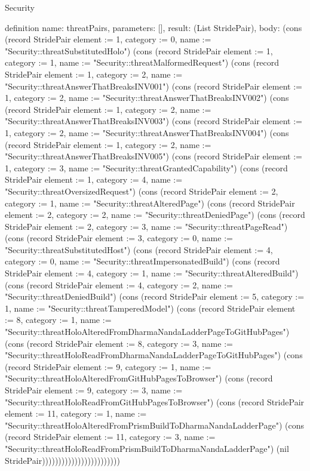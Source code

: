 \begin{lexlean}{Security}
\begin{semanticmodule}
definition{
  name: threatPairs,
  parameters: [],
  result: (List StridePair),
  body: (cons (record StridePair {element := 1, category := 0, name := "Security::threatSubstitutedHolo"}) (cons (record StridePair {element := 1, category := 1, name := "Security::threatMalformedRequest"}) (cons (record StridePair {element := 1, category := 2, name := "Security::threatAnswerThatBreaksINV001"}) (cons (record StridePair {element := 1, category := 2, name := "Security::threatAnswerThatBreaksINV002"}) (cons (record StridePair {element := 1, category := 2, name := "Security::threatAnswerThatBreaksINV003"}) (cons (record StridePair {element := 1, category := 2, name := "Security::threatAnswerThatBreaksINV004"}) (cons (record StridePair {element := 1, category := 2, name := "Security::threatAnswerThatBreaksINV005"}) (cons (record StridePair {element := 1, category := 3, name := "Security::threatGrantedCapability"}) (cons (record StridePair {element := 1, category := 4, name := "Security::threatOversizedRequest"}) (cons (record StridePair {element := 2, category := 1, name := "Security::threatAlteredPage"}) (cons (record StridePair {element := 2, category := 2, name := "Security::threatDeniedPage"}) (cons (record StridePair {element := 2, category := 3, name := "Security::threatPageRead"}) (cons (record StridePair {element := 3, category := 0, name := "Security::threatSubstitutedHost"}) (cons (record StridePair {element := 4, category := 0, name := "Security::threatImpersonatedBuild"}) (cons (record StridePair {element := 4, category := 1, name := "Security::threatAlteredBuild"}) (cons (record StridePair {element := 4, category := 2, name := "Security::threatDeniedBuild"}) (cons (record StridePair {element := 5, category := 1, name := "Security::threatTamperedModel"}) (cons (record StridePair {element := 8, category := 1, name := "Security::threatHoloAlteredFromDharmaNandaLadderPageToGitHubPages"}) (cons (record StridePair {element := 8, category := 3, name := "Security::threatHoloReadFromDharmaNandaLadderPageToGitHubPages"}) (cons (record StridePair {element := 9, category := 1, name := "Security::threatHoloAlteredFromGitHubPagesToBrowser"}) (cons (record StridePair {element := 9, category := 3, name := "Security::threatHoloReadFromGitHubPagesToBrowser"}) (cons (record StridePair {element := 11, category := 1, name := "Security::threatHoloAlteredFromPrismBuildToDharmaNandaLadderPage"}) (cons (record StridePair {element := 11, category := 3, name := "Security::threatHoloReadFromPrismBuildToDharmaNandaLadderPage"}) (nil StridePair))))))))))))))))))))))))
}


\end{semanticmodule}
\end{lexlean}
